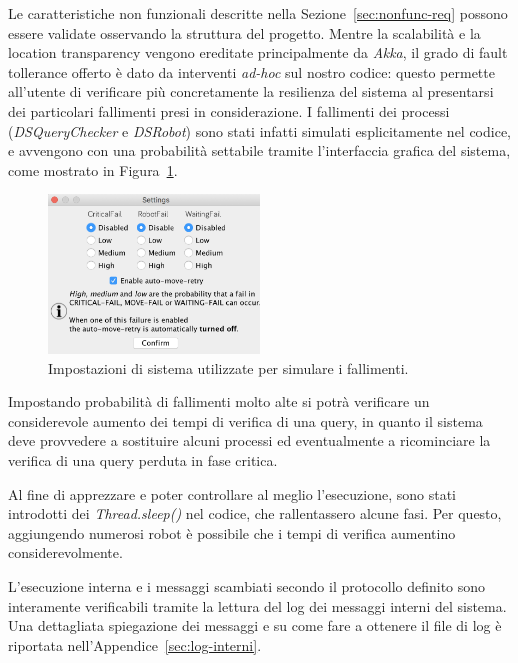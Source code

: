 Le caratteristiche non funzionali descritte nella Sezione~\ref{sec:nonfunc-req}
possono essere validate osservando la struttura del progetto.
Mentre la scalabilità e la location transparency vengono ereditate
principalmente da \emph{Akka},
il grado di fault tollerance offerto è dato da interventi \emph{ad-hoc}
sul nostro codice: questo permette all'utente di verificare più
concretamente la resilienza del sistema al presentarsi dei
particolari fallimenti presi in considerazione.
I fallimenti dei processi (\emph{DSQueryChecker} e \emph{DSRobot})
sono stati infatti simulati esplicitamente nel codice,
e avvengono con una probabilità settabile tramite l'interfaccia grafica
del sistema, come mostrato in Figura~\ref{fig:settings}.
\begin{figure}
	\centering
	\includegraphics[width=0.5\textwidth]{immagini/settings.png}
	\caption{\label{fig:settings}
        Impostazioni di sistema utilizzate per simulare i fallimenti.}
\end{figure}
Impostando probabilità di fallimenti molto alte si potrà verificare
un considerevole aumento dei tempi di verifica di una query,
in quanto il sistema deve provvedere a sostituire alcuni processi
ed eventualmente a ricominciare la verifica di una query perduta in
fase critica.

Al fine di apprezzare e poter controllare al meglio l'esecuzione,
sono stati introdotti dei \emph{Thread.sleep()} nel codice,
che rallentassero alcune fasi. Per questo, aggiungendo numerosi robot
è possibile che i tempi di verifica aumentino considerevolmente.

L'esecuzione interna e i messaggi scambiati secondo il protocollo
definito sono interamente verificabili tramite la lettura del
log dei messaggi interni del sistema.
Una dettagliata spiegazione dei messaggi e su come fare a ottenere
il file di log è riportata nell'Appendice~\ref{sec:log-interni}.

